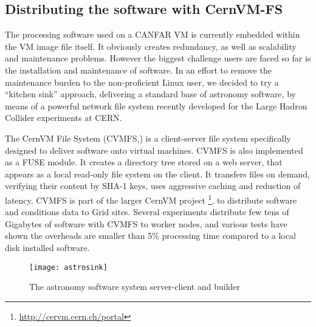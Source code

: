 \documentclass[11pt,twoside]{article}
\begin{document}
\subsection{Distributing the software with CernVM-FS}
The processing software used on a CANFAR VM is currently embedded within the VM image
file itself. It obviously creates redundancy, as
well as scalability and maintenance problems. However the
biggest challenge users are faced so far is the installation and
maintenance of software. In an effort to remove the maintenance burden
to the non-proficient Linux user, we decided to try a ``kitchen sink''
approach, delivering a standard base of astronomy software, by means
of a powerful network file system recently developed for the Large
Hadron Collider experiments at CERN.

\indent The CernVM File System (CVMFS,\cite{blomer11}) is a client-server file system
specifically designed to deliver software onto virtual machines. CVMFS
is also implemented as a FUSE module. It creates a directory
tree stored on a web server, that appears as a local read-only file
system on the client. It transfers files on demand, verifying their
content by SHA-1 keys,  uses aggressive caching and reduction of latency. CVMFS is
part of the larger CernVM project \footnote{\url{http://cervm.cern.ch/portal}}, to distribute software and
conditions data to Grid sites. Several experiments distribute few tens of Gigabytes of software with CVMFS to worker
nodes, and various tests have shown the overheads are smaller than 5\%
processing time compared to a local disk installed software.

\begin{center}
  \begin{figure}
    \texttt{[image: astrosink]}
    \caption{The astronomy software system server-client and builder}
  \end{figure}  
\end{center}
\end{document}
